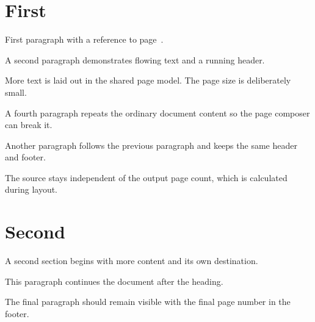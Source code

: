 \documentclass{article}
\begin{document}
\section{First}
\label{first}
First paragraph with a reference to page~\pageref{first}.

A second paragraph demonstrates flowing text and a running header.

More text is laid out in the shared page model. The page size is deliberately small.

A fourth paragraph repeats the ordinary document content so the page composer can break it.

Another paragraph follows the previous paragraph and keeps the same header and footer.

The source stays independent of the output page count, which is calculated during layout.

\section{Second}
A second section begins with more content and its own destination.

This paragraph continues the document after the heading.

The final paragraph should remain visible with the final page number in the footer.
\end{document}
